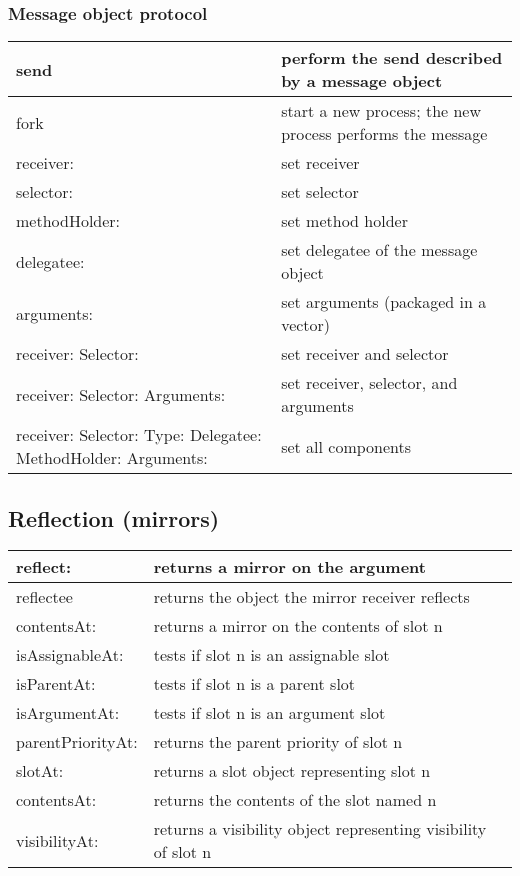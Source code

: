 \documentclass[letterpaper,10pt,english]{sphinxmanual}
\begin{document}
\subsubsection{Message object protocol}
\label{\detokenize{usefulselectors:message-object-protocol}}
\noindent\begin{tabulary}{\linewidth}{p{5cm} p{10cm}}
\hline

send
&
perform the send described by a message object
\\
\hline
fork
&
start a new process; the new process performs the message
\\
\hline
receiver:
&
set receiver
\\
\hline
selector:
&
set selector
\\
\hline
methodHolder:
&
set method holder
\\
\hline
delegatee:
&
set delegatee of the message object
\\
\hline
arguments:
&
set arguments (packaged in a vector)
\\
\hline
receiver: Selector:
&
set receiver and selector
\\
\hline
receiver: Selector: Arguments:
&
set receiver, selector, and arguments
\\
\hline
receiver: Selector: Type: Delegatee: MethodHolder: Arguments:
&
set all components
\\
\hline\end{tabulary}



\subsection{Reflection (mirrors)}
\label{\detokenize{usefulselectors:reflection-mirrors}}
\noindent\begin{tabulary}{\linewidth}{p{5cm} p{10cm}}
\hline

reflect:
&
returns a mirror on the argument
\\
\hline
reflectee
&
returns the object the mirror receiver reflects
\\
\hline
contentsAt:
&
returns a mirror on the contents of slot n
\\
\hline
isAssignableAt:
&
tests if slot n is an assignable slot
\\
\hline
isParentAt:
&
tests if slot n is a parent slot
\\
\hline
isArgumentAt:
&
tests if slot n is an argument slot
\\
\hline
parentPriorityAt:
&
returns the parent priority of slot n
\\
\hline
slotAt:
&
returns a slot object representing slot n
\\
\hline
contentsAt:
&
returns the contents of the slot named n
\\
\hline
visibilityAt:
&
returns a visibility object representing visibility of slot n
\\
\hline\end{tabulary}
\end{document}
